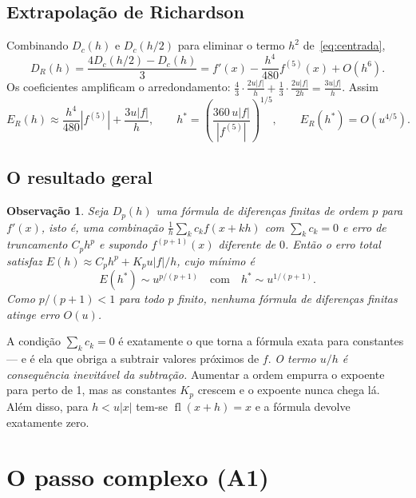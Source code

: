 \documentclass[11pt,a4paper]{article}
\newtheorem{observacao}{Observação}
\newcommand{\fl}{\operatorname{fl}}
\begin{document}
\subsection{Extrapolação de Richardson}
Combinando $D_c(h)$ e $D_c(h/2)$ para eliminar o termo $h^2$ de~\eqref{eq:centrada},
\begin{equation}
D_R(h) = \frac{4D_c(h/2)-D_c(h)}{3} = f'(x) - \frac{h^4}{480}f^{(5)}(x) + O(h^6).
\end{equation}
Os coeficientes amplificam o arredondamento: $\frac43\cdot\frac{2u|f|}{h} + \frac13\cdot\frac{2u|f|}{2h} = \frac{3u|f|}{h}$. Assim
\begin{equation}
E_R(h)\approx \frac{h^4}{480}|f^{(5)}| + \frac{3u|f|}{h}, \qquad h^\ast = \left(\frac{360\,u|f|}{|f^{(5)}|}\right)^{1/5},\qquad E_R(h^\ast)=O(u^{4/5}).
\end{equation}

\subsection{O resultado geral}
\begin{observacao}
    
Seja $D_p(h)$ uma fórmula de diferenças finitas de ordem $p$ para $f'(x)$, isto é, uma combinação $\frac1h\sum_k c_k f(x+kh)$ com $\sum_k c_k=0$ e erro de truncamento $C_ph^p$ e supondo $f^{(p+1)}(x)$ diferente de $0$. Então o erro total satisfaz $E(h)\approx C_ph^p + K_pu|f|/h$, cujo mínimo é
\[
E(h^\ast)  \sim u^{p/(p+1)} \quad\text{com}\quad h^\ast \sim u^{1/(p+1)}.
\]
Como $p/(p+1)<1$ para todo $p$ finito, nenhuma fórmula de diferenças finitas atinge erro $O(u)$.
\end{observacao}

A condição $\sum_kc_k=0$ é exatamente o que torna a fórmula exata para constantes --- e é ela que obriga a subtrair valores próximos de $f$. \emph{O termo $u/h$ é consequência inevitável da subtração.} Aumentar a ordem empurra o expoente para perto de 1, mas as constantes $K_p$ crescem e o expoente nunca chega lá. Além disso, para $h<u|x|$ tem-se $\fl(x+h)=x$ e a fórmula devolve exatamente zero.

\section{O passo complexo (A1)}
\label{sec:cs}
\end{document}
